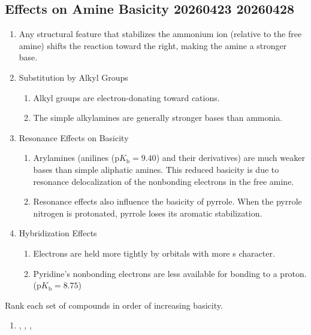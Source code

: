\subsection{Effects on Amine Basicity 20260423 20260428}

\begin{enumerate}
    \item Any structural feature that stabilizes the ammonium ion (relative to the free amine) shifts the reaction toward the right, making the amine a stronger base.
    \item Substitution by Alkyl Groups
    \begin{enumerate}
        \item Alkyl groups are electron-donating toward cations.
        \item The simple alkylamines are generally stronger bases than ammonia.
    \end{enumerate}
    \item Resonance Effects on Basicity
    \begin{enumerate}
        \item Arylamines (anilines ($\mathrm{p}K_{\mathrm{b}} = 9.40$) and their derivatives) are much weaker bases than simple aliphatic amines. This reduced basicity is due to resonance delocalization of the nonbonding electrons in the free amine.
        \item Resonance effects also influence the basicity of pyrrole. When the pyrrole nitrogen is protonated, pyrrole loses its aromatic stabilization.
    \end{enumerate}
    \item Hybridization Effects
    \begin{enumerate}
        \item Electrons are held more tightly by orbitals with more s character.
        \item Pyridine’s nonbonding electrons are less available for bonding to a proton. ($\mathrm{p}K_{\mathrm{b}} = 8.75$)
    \end{enumerate}
\end{enumerate}

\begin{example} %
    Rank each set of compounds in order of increasing basicity.
    \begin{enumerate}[label=(\alph*)]
        \item {}, , , 
    \end{enumerate}
\end{example}

